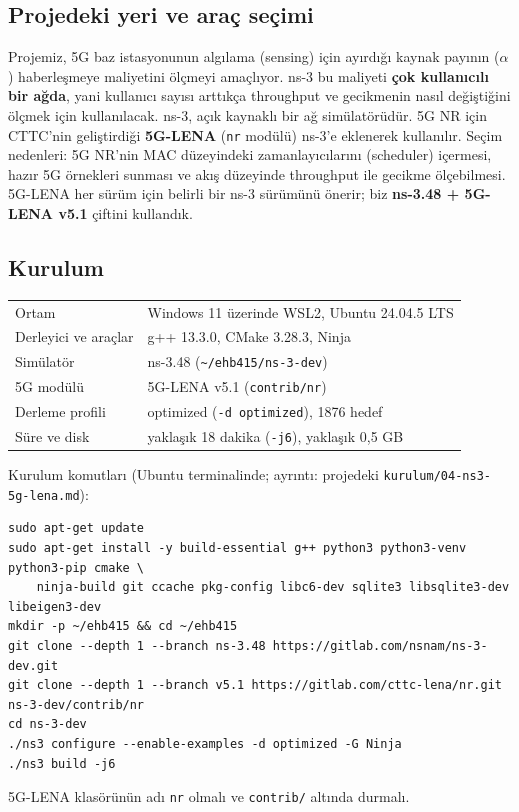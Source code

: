 
\subsection*{Projedeki yeri ve araç seçimi}
Projemiz, 5G baz istasyonunun algılama (sensing) için ayırdığı kaynak payının ($\alpha$) haberleşmeye maliyetini ölçmeyi amaçlıyor. ns-3 bu maliyeti \textbf{çok kullanıcılı bir ağda}, yani kullanıcı sayısı arttıkça throughput ve gecikmenin nasıl değiştiğini ölçmek için kullanılacak. ns-3, açık kaynaklı bir ağ simülatörüdür. 5G NR için CTTC'nin geliştirdiği \textbf{5G-LENA} (\texttt{nr} modülü) ns-3'e eklenerek kullanılır. Seçim nedenleri: 5G NR'nin MAC düzeyindeki zamanlayıcılarını (scheduler) içermesi, hazır 5G örnekleri sunması ve akış düzeyinde throughput ile gecikme ölçebilmesi. 5G-LENA her sürüm için belirli bir ns-3 sürümünü önerir; biz \textbf{ns-3.48 + 5G-LENA v5.1} çiftini kullandık.

\subsection*{Kurulum}
\begin{center}\sffamily\small
\begin{tabular}{@{}ll@{}}
\toprule
Ortam & Windows 11 üzerinde WSL2, Ubuntu 24.04.5 LTS \\
Derleyici ve araçlar & g++ 13.3.0, CMake 3.28.3, Ninja \\
Simülatör & ns-3.48 (\texttt{\textasciitilde/ehb415/ns-3-dev}) \\
5G modülü & 5G-LENA v5.1 (\texttt{contrib/nr}) \\
Derleme profili & optimized (\texttt{-d optimized}), 1876 hedef \\
Süre ve disk & yaklaşık 18 dakika (\texttt{-j6}), yaklaşık 0,5 GB \\
\bottomrule
\end{tabular}
\end{center}
Kurulum komutları (Ubuntu terminalinde; ayrıntı: projedeki \texttt{kurulum/04-ns3-5g-lena.md}):
\begin{lstlisting}
sudo apt-get update
sudo apt-get install -y build-essential g++ python3 python3-venv python3-pip cmake \
    ninja-build git ccache pkg-config libc6-dev sqlite3 libsqlite3-dev libeigen3-dev
mkdir -p ~/ehb415 && cd ~/ehb415
git clone --depth 1 --branch ns-3.48 https://gitlab.com/nsnam/ns-3-dev.git
git clone --depth 1 --branch v5.1 https://gitlab.com/cttc-lena/nr.git ns-3-dev/contrib/nr
cd ns-3-dev
./ns3 configure --enable-examples -d optimized -G Ninja
./ns3 build -j6
\end{lstlisting}
5G-LENA klasörünün adı \texttt{nr} olmalı ve \texttt{contrib/} altında durmalı.

